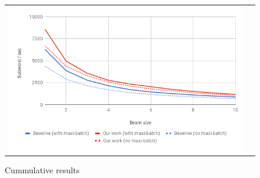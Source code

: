 \documentclass[11pt,a4paper]{article}
\begin{document}
\begin{figure}
\centering
\begin{tabular}{cc}
{\includegraphics[scale=0.3]{cummulative-opensubtitles.png}} 
\end{tabular}
\caption{Cummulative results}
\label{fig:cummulative-opensubtitles}
\end{figure} 




\end{document}
